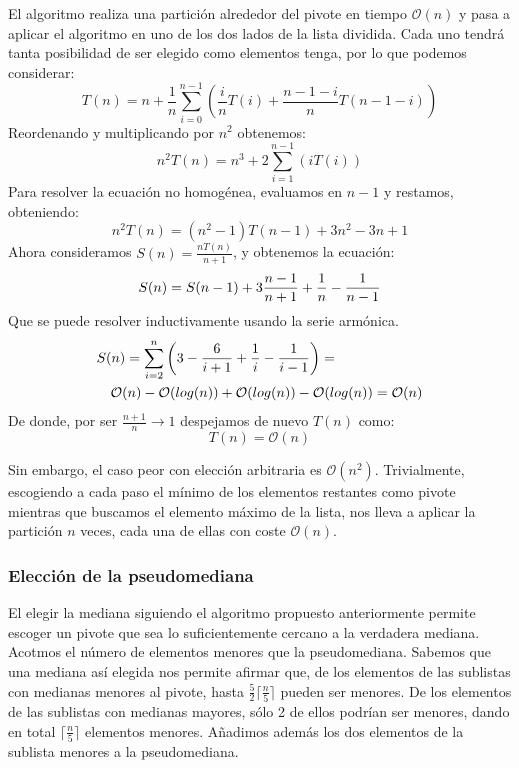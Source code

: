 \documentclass[a4paper, 11pt]{article} %
\begin{document}
      El algoritmo realiza una partición alrededor del pivote en tiempo $\mathcal{O}(n)$ y pasa a aplicar el algoritmo
      en uno de los dos lados de la lista dividida. Cada uno tendrá tanta posibilidad de ser elegido como elementos tenga,
      por lo que podemos considerar:
      \begin{equation}
	T(n) = n + \frac{1}{n}\sum_{i=0}^{n-1}\left( \frac{i}{n}T(i) + \frac{n-1-i}{n}T(n-1-i) \right)
      \end{equation}
      Reordenando y multiplicando por $n^2$ obtenemos:
      \begin{equation}
        n^2T(n) = n^3 + 2\sum^{n-1}_{i=1} \left( i T(i) \right)
      \end{equation}
      Para resolver la ecuación no homogénea, evaluamos en $n-1$ y restamos, obteniendo:
      \begin{equation}
        n^2T(n) = (n^2-1)T(n-1) + 3n^2 - 3n + 1
      \end{equation}
      Ahora consideramos $S(n) = \frac{nT(n)}{n+1}$, y obtenemos la ecuación:
      \begin{equation}
        S(n) = S(n-1) + 3\frac{n-1}{n+1} + \frac{1}{n} - \frac{1}{n-1} \\
      \end{equation}
      Que se puede resolver inductivamente usando la serie armónica.
      \begin{eqnarray}
        \lefteqn{S(n) = \sum_{i=2}^n{\left( 3 - \frac{6}{i+1} + \frac{1}{i} - \frac{1}{i-1} \right)} = }\\ 
        &&\mathcal{O}(n) - \mathcal{O}(log(n)) + \mathcal{O}(log(n)) - \mathcal{O}(log(n)) = \mathcal{O}(n)
      \end{eqnarray}
      De donde, por ser $\frac{n+1}{n}\longrightarrow 1$ despejamos de nuevo $T(n)$ como:
      \begin{equation}
        T(n) =  \mathcal{O}(n)
      \end{equation}

      Sin embargo, el caso peor con elección arbitraria es $\mathcal{O}(n^2)$. Trivialmente, escogiendo a cada paso el mínimo de los elementos restantes como pivote
      mientras que buscamos el elemento máximo de la lista, nos lleva a aplicar la partición $n$ veces, cada una de ellas con coste $\mathcal{O}(n)$.
    
    \subsubsection{Elección de la pseudomediana}
      El elegir la mediana siguiendo el algoritmo propuesto anteriormente permite escoger un pivote que sea lo suficientemente cercano a la verdadera mediana.
      Acotmos el número de elementos menores que la pseudomediana. Sabemos que una mediana así elegida nos permite afirmar que, de los elementos de las sublistas
      con medianas menores al pivote, hasta $\frac{5}{2} \lceil \frac{n}{5} \rceil$ pueden ser menores. De los elementos de las sublistas con medianas mayores,
      sólo 2 de ellos podrían ser menores, dando en total $ \lceil \frac{n}{5} \rceil$ elementos menores. Añadimos además los dos elementos de la sublista menores a la pseudomediana.
      
\end{document}
